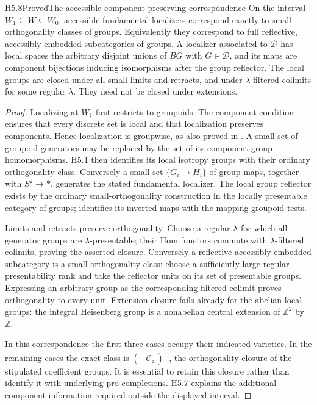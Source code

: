 \begin{claim}{H5.8}{Proved}{The accessible component-preserving correspondence}
On the interval $W_1\subseteq W\subseteq W_0$, accessible
fundamental localizers correspond exactly to small
orthogonality classes of groups. Equivalently they
correspond to full reflective, accessibly embedded
subcategories of groups. A localizer associated to
$\mathcal D$ has local spaces the arbitrary disjoint
unions of $BG$ with $G\in\mathcal D$, and its maps are
component bijections inducing isomorphisms after the
group reflector.
The local groups are closed under all small limits
and retracts, and under $\lambda$-filtered colimits
for some regular $\lambda$. They need not be closed
under extensions.
\end{claim}
\begin{proof}
Localizing at $W_1$ first restricts to groupoids.
The component condition ensures that every discrete
set is local and that localization preserves
components. Hence localization is groupwise, as
also proved in \citet[Theorems 2.6--2.7 and 3.3]{EH5CGT2006}.
A small set of groupoid generators may be replaced
by the set of its component group homomorphisms.
H5.1 then identifies its local isotropy groups with
their ordinary orthogonality class.
Conversely a small set $\{G_i\to H_i\}$ of group
maps, together with $S^2\to *$, generates the stated
fundamental localizer. The local group reflector
exists by the ordinary small-orthogonality
construction in the locally presentable category
of groups; \citet[Theorem 3.1]{EH5CGT2006} identifies
its inverted maps with the mapping-groupoid tests.

Limits and retracts preserve orthogonality.
Choose a regular $\lambda$ for which all generator
groups are $\lambda$-presentable; their Hom functors
commute with $\lambda$-filtered colimits, proving
the asserted closure. Conversely a reflective
accessibly embedded subcategory is a small
orthogonality class: choose a sufficiently large
regular presentability rank and take the reflector
units on its set of presentable groups. Expressing
an arbitrary group as the corresponding filtered
colimit proves orthogonality to every unit.
Extension closure fails already for the abelian
local groups: the integral Heisenberg group is a
nonabelian central extension of $\mathbb Z^2$
by $\mathbb Z$.

In this correspondence the first three cases
occupy their indicated varieties. In the remaining
cases the exact class is
$(\,{}^\perp\mathcal C_{\mathfrak a}\,)^\perp$,
the orthogonality closure of the stipulated
coefficient groups. It is essential to retain this
closure rather than identify it with underlying
pro-completions. H5.7 explains the additional
component information required outside the
displayed interval.
\end{proof}

